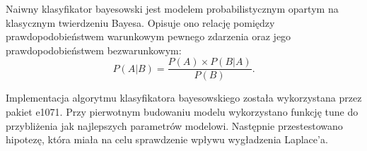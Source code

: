 
Naiwny klasyfikator bayesowski jest modelem probabilistycznym opartym na klasycznym twierdzeniu Bayesa. Opisuje ono relację pomiędzy prawdopodobieństwem warunkowym pewnego zdarzenia oraz jego prawdopodobieństwem bezwarunkowym:
\begin{equation}
\label{eq:bayes}
    P(A|B) = \frac{P(A)\times P(B|A)}{P(B)}.
\end{equation}



Implementacja algorytmu klasyfikatora bayesowskiego została wykorzystana przez pakiet e1071. Przy pierwotnym budowaniu modelu wykorzystano funkcję tune do przybliżenia jak najlepszych parametrów modelowi. Następnie przestestowano hipotezę, która miała na celu sprawdzenie wpływu wygładzenia Laplace'a.